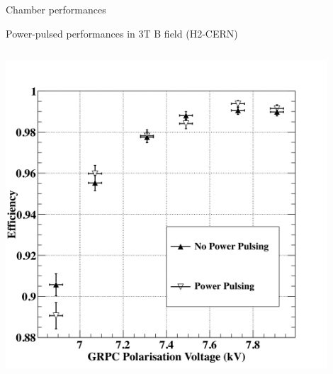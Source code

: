 \documentclass[10pt]{beamer}
\begin{document}
\begin{frame}{Chamber performances  }
\begin{block}{Power-pulsed performances in 3T B field (H2-CERN)}
\begin{columns}
      \begin{column}{0.5\textwidth}
        \centerline{\includegraphics[width=0.9\textwidth]{images/PowerPulsingHvScan}}
      \end{column}
    \end{columns}
\end{block}

\end{frame}
\end{document}
